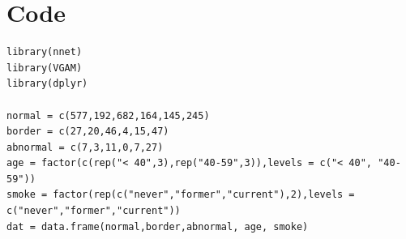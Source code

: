\documentclass[12pt,fullpagea4paper,a4paper,doublespace]{article}
\begin{document}
 
\footnotesize

\section{Code}

\begin{verbatim}
library(nnet)
library(VGAM)
library(dplyr)

normal = c(577,192,682,164,145,245)
border = c(27,20,46,4,15,47)
abnormal = c(7,3,11,0,7,27)
age = factor(c(rep("< 40",3),rep("40-59",3)),levels = c("< 40", "40-59"))
smoke = factor(rep(c("never","former","current"),2),levels = c("never","former","current"))
dat = data.frame(normal,border,abnormal, age, smoke)
\end{verbatim}
\end{document}
